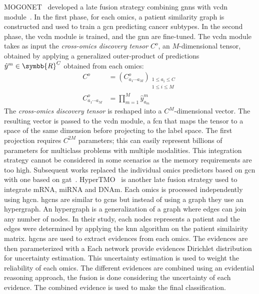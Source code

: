 \documentclass[../main.tex]{subfiles}
\begin{document}
			MOGONET~\cite{MOGONET} developed a late fusion strategy combining \glspl{gnn} with \gls{vcdn} module~\cite{VCDN}.
			In the first phase, for each omics, a patient similarity graph is constructed and used to train a \gls{gcn} predicting cancer subtypes.
			In the second phase, the \gls{vcdn} module is trained, and the \gls{gnn} are fine-tuned.
			The \gls{vcdn} module takes as input the \emph{cross-omics discovery tensor} \(C^{o}\), an \(M\)-dimensional tensor, obtained by applying a generalized outer-product of predictions \(\hat{y}^{m} \in \symbb{R}^{C}\) obtained from each omics:
			\begin{align}
				C^{o}                     & = {\left(C^{o}_{a_{1}\cdots a_{M}}\right)}_{\substack{1 \leq a_{i} \leq C \\ 1 \leq i \leq M}} \\
				C^{o}_{a_{1}\cdots a_{M}} & = \prod_{m=1}^{M}\hat{y}_{a_{m}}^{m}
			\end{align}
			The \emph{cross-omics discovery tensor} is reshaped into a \(C^{M}\)-dimensional vector.
			The resulting vector is passed to the \gls{vcdn} module, a \gls{fcn} that maps the tensor to a space of the same dimension before projecting to the label space.
			The first projection requires \(C^{2M}\) parameters; this can easily represent billions of parameters for multiclass problems with multiple modalities.
			This integration strategy cannot be considered in some scenarios as the memory requirements are too high.
			Subsequent works replaced the individual omics predictors based on \gls{gcn} with one based on \gls{gat}~\cite{MODILM,Leng2022}.
			HyperTMO~\cite{Wang2024} is another late fusion strategy used to integrate mRNA, miRNA and DNAm.
			Each omics is processed independently using \gls{hgcn}.
			\Glspl{hgcn} are similar to \glspl{gcn} but instead of using a graph they use an hypergraph.
			An hypergraph is a generalization of a graph where edges can join any number of nodes.
			In their study, each nodes represents a patient and the edges were determined by applying the \gls{knn} algorithm on the patient similairity matrix.
			\Glspl{hgcn} are used to extract evidences from each omics.
			The evidences are then parameterized with a
			Each network provide evidences Dirichlet distribution for uncertainty estimation.
			This uncertainty estimation is used to weight the reliability of each omics.
			The different evidences are combined using an evidential reasoning approach, the fusion is done considering the uncertainty of each evidence.
			The combined evidence is used to make the final classification.
\end{document}
